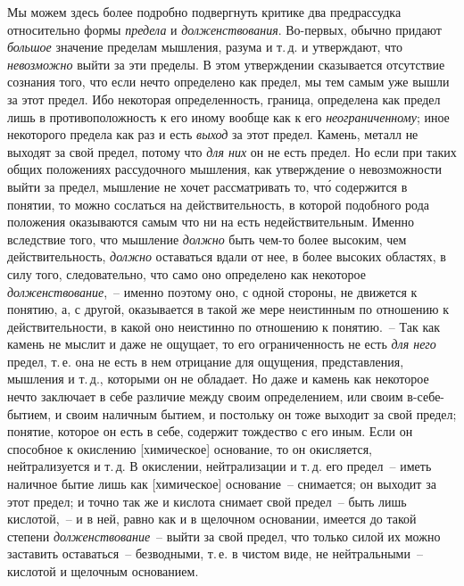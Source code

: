 Мы можем здесь более подробно подвергнуть критике
два предрассудка относительно формы \emph{предела} и \emph{долженствования}.
Во-первых, обычно придают \emph{большое} значение
пределам мышления, разума и т.\,д. и утверждают, что
\emph{невозможно} выйти за эти пределы. В этом утверждении
сказывается отсутствие сознания того, что если нечто определено
как предел, мы тем самым уже вышли за этот
предел. Ибо некоторая определенность, граница, определена
как предел лишь в противоположность к его иному вообще
как к его \emph{неограниченному}; иное некоторого предела
как раз и есть \emph{выход} за этот предел. Камень, металл
не выходят за свой предел, потому что \emph{для них} он не есть
предел. Но если при таких общих положениях рассудочного
мышления, как утверждение о невозможности выйти
за предел, мышление не хочет рассматривать то, чт\'о содержится
в понятии, то можно сослаться на действительность,
в которой подобного рода положения оказываются
самым что ни на есть недействительным. Именно вследствие
того, что мышление \emph{должно} быть чем-то более высоким,
чем действительность, \emph{должно} оставаться вдали от
нее, в более высоких областях, в силу того, следовательно,
что само оно определено как некоторое \emph{долженствование},~--
именно поэтому оно, с одной стороны, не движется
к понятию, а, с другой, оказывается в такой же мере неистинным
по отношению к действительности, в какой оно
неистинно по отношению к понятию.~-- Так как камень
не мыслит и даже не ощущает, то его ограниченность не
есть \emph{для него} предел, т.\,е. она не есть в нем отрицание
для ощущения, представления, мышления и т.\,д., которыми
он не обладает. Но даже и камень как некоторое нечто
заключает в себе различие между своим определением,
или своим в-себе-бытием, и своим наличным бытием,
и постольку он тоже выходит за свой предел; понятие,
которое он есть в себе, содержит тождество с его иным.
Если он способное к окислению [химическое] основание, то
он окисляется, нейтрализуется и т.\,д. В окислении, нейтрализации
и т.\,д. его предел~-- иметь наличное бытие
лишь как [химическое] основание~-- снимается; он выходит
за этот предел; и точно так же и кислота снимает
свой предел~-- быть лишь кислотой,~-- и в ней, равно как
и в щелочном основании, имеется до такой степени \emph{долженствование}~--
выйти за свой предел, что только силой
их можно заставить оставаться~-- безводными, т.\,е. в чистом
виде, не нейтральными~-- кислотой и щелочным основанием.

